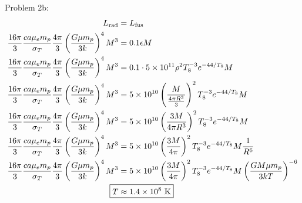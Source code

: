 \documentclass[10pt,letter,preprint]{aastex}
\newcommand{\rp}{\right)}
\newcommand{\lp}{\left(}
\begin{document}
Problem 2b:\\
\begin{align}
L_{\textrm{rad}} &= L_{\textrm{fus}}\\
 \frac{16 \pi}{3} \frac{ca\mu_e m_p}{\sigma_T}\frac{4\pi}{3} \lp \frac{G\mu m_p}{3k} \rp^4 M^3 &= 0.1 \epsilon M\\
 \frac{16 \pi}{3} \frac{ca\mu_e m_p}{\sigma_T}\frac{4\pi}{3} \lp \frac{G\mu m_p}{3k} \rp^4 M^3 &= 0.1 \cdot 5 \times 10^{11} \rho^2 T_8^{-3} e^{-44/T_8}  M\\
 \frac{16 \pi}{3} \frac{ca\mu_e m_p}{\sigma_T}\frac{4\pi}{3} \lp \frac{G\mu m_p}{3k} \rp^4 M^3 &=  5 \times 10^{10} \lp \frac{M}{\frac{4\pi R^3}{3}} \rp^2 T_8^{-3} e^{-44/T_8}  M\\
 \frac{16 \pi}{3} \frac{ca\mu_e m_p}{\sigma_T}\frac{4\pi}{3} \lp \frac{G\mu m_p}{3k} \rp^4 M^3 &=  5 \times 10^{10} \lp \frac{3M}{4\pi R^3} \rp^2 T_8^{-3} e^{-44/T_8}  M\\ 
 \frac{16 \pi}{3} \frac{ca\mu_e m_p}{\sigma_T}\frac{4\pi}{3} \lp \frac{G\mu m_p}{3k} \rp^4 M^3 &=  5 \times 10^{10} \lp \frac{3M}{4\pi} \rp^2 T_8^{-3} e^{-44/T_8}  M \frac{1}{R^6}\\ 
 \frac{16 \pi}{3} \frac{ca\mu_e m_p}{\sigma_T}\frac{4\pi}{3} \lp \frac{G\mu m_p}{3k} \rp^4 M^3 &=  5 \times 10^{10} \lp \frac{3M}{4\pi} \rp^2 T_8^{-3} e^{-44/T_8}  M  \lp \frac{GM\mu m_p}{3kT} \rp^{-6} \\   
\Aboxed{T &\approx 1.4 \times 10^8\textrm{ K}}
\end{align}
\end{document}
